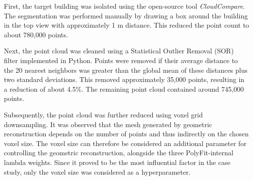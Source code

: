 \begin{English}
    First, the target building was isolated using the open-source tool \textit{CloudCompare}. The segmentation was performed manually by drawing a box around the building in the top view with approximately 1 m distance. This reduced the point count to about 780,000 points.

    Next, the point cloud was cleaned using a Statistical Outlier Removal (SOR) filter implemented in Python. Points were removed if their average distance to the 20 nearest neighbors was greater than the global mean of these distances plus two standard deviations. This removed approximately 35,000 points, resulting in a reduction of about 4.5\%. The remaining point cloud contained around 745,000 points.

    Subsequently, the point cloud was further reduced using voxel grid downsampling. It was observed that the mesh generated by geometric reconstruction depends on the number of points and thus indirectly on the chosen voxel size. The voxel size can therefore be considered an additional parameter for controlling the geometric reconstruction, alongside the three PolyFit-internal lambda weights. Since it proved to be the most influential factor in the case study, only the voxel size was considered as a hyperparameter.
\end{English}

